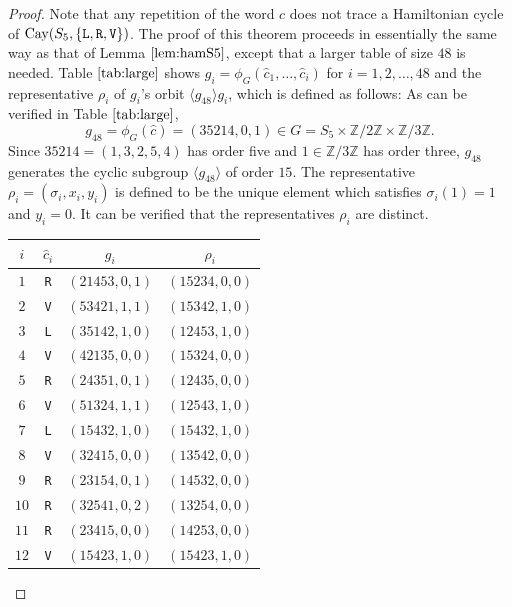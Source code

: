 \documentclass[lualatex,11pt]{article}
\begin{document}
\begin{proof}
 Note that any repetition of the word $c$ does not trace a Hamiltonian cycle
 of ${\rm Cay}(S_5, \{{\mathtt L}, {\mathtt R}, {\mathtt V}\})$.
 The proof of this theorem proceeds in essentially the same way as that of Lemma $\ref{lem:hamS5}$, 
 except that a larger table of size $48$ is needed. 
 Table $\ref{tab:large}$ shows $g_i=\phi_G(\hat{c}_1,\ldots,\hat{c}_i)$ for $i=1,2,\ldots,48$ and
 the representative $\rho_i$ of $g_i$'s orbit $\langle g_{48}\rangle g_i$, which is defined
 as follows:
 As can be verified in Table $\ref{tab:large}$,
 \[
 g_{48}=\phi_G(\hat{c})=(35214, 0, 1) \in G = S_5 \times {\mathbb Z}/2{\mathbb Z} \times {\mathbb Z}/3{\mathbb Z}.
 \]
 Since $35214=(1,3,2,5,4)$ has order five and $1\in {\mathbb Z}/3{\mathbb Z}$ has order three,
 $g_{48}$ generates the cyclic subgroup $\langle g_{48}\rangle$ of order $15$.
 The representative $\rho_i=(\sigma_i, x_i, y_i)$ is defined to be the
 unique element which satisfies $\sigma_i(1)=1$ and $y_i=0$.
 It can be verified that the representatives $\rho_i$ are distinct.
\begin{center}
 \begin{table}[H]
  \begin{center}
   \begin{tabular}{c|c|c|c}
    $i$ & $\hat{c}_i$ & $g_i$ & $\rho_i$\\
    \hline
   $1 $ &   {\tt R} &  $(21453,0,1)$ & $(15234,0,0)$\\
   $2 $ &   {\tt V} &  $(53421,1,1)$ & $(15342,1,0)$\\
   $3 $ &   {\tt L} &  $(35142,1,0)$ & $(12453,1,0)$\\
   $4 $ &   {\tt V} &  $(42135,0,0)$ & $(15324,0,0)$\\
   $5 $ &   {\tt R} &  $(24351,0,1)$ & $(12435,0,0)$\\
   $6 $ &   {\tt V} &  $(51324,1,1)$ & $(12543,1,0)$\\
   $7 $ &   {\tt L} &  $(15432,1,0)$ & $(15432,1,0)$\\
   $8 $ &   {\tt V} &  $(32415,0,0)$ & $(13542,0,0)$\\
   $9 $ &   {\tt R} &  $(23154,0,1)$ & $(14532,0,0)$\\
   $10$ &   {\tt R} &  $(32541,0,2)$ & $(13254,0,0)$\\
   $11$ &   {\tt R} &  $(23415,0,0)$ & $(14253,0,0)$\\
   $12$ &   {\tt V} &  $(15423,1,0)$ & $(15423,1,0)$\\

\end{tabular}
\end{center}
\end{table}
\end{center}
\end{proof}
\end{document}
